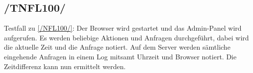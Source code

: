 \subsection*{/TNFL100/}

\label{/TNFL100/} Testfall zu \ref{/NFL100/}: Der \Gls{Browser} wird gestartet und das \Gls{Admin-Panel} wird aufgerufen.
Es werden beliebige Aktionen und Anfragen durchgeführt, dabei wird die aktuelle Zeit und die Anfrage notiert.
Auf dem Server werden sämtliche eingehende Anfragen in einem \Gls{Log} mitsamt Uhrzeit und \Gls{Browser} notiert.
Die Zeitdifferenz kann nun ermittelt werden.